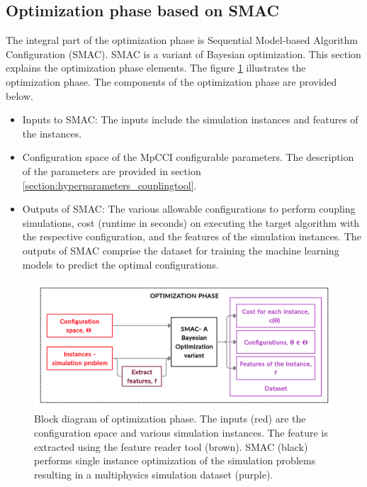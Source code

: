 \subsection{Optimization phase based on SMAC}
\label{section:optimization_phase}

The integral part of the optimization phase is Sequential Model-based Algorithm Configuration (SMAC). SMAC is a variant of Bayesian optimization. This section explains the optimization phase elements. The figure \ref{fig:optimization} illustrates the optimization phase. The components of the optimization phase are provided below.

\begin{itemize}
\item Inputs to SMAC: The inputs include the simulation instances and features of the instances.
\item Configuration space of the MpCCI configurable parameters. The description of the parameters are provided in section \ref{section:hyperparameters_couplingtool}. 
\item Outputs of SMAC: The various allowable configurations to perform coupling simulations, cost (runtime in seconds) on executing the target algorithm with the respective configuration, and the features of the simulation instances. The outputs of SMAC comprise the dataset for training the machine learning models to predict the optimal configurations.
\end{itemize}

\begin{figure}[!ht]
\centering
\includegraphics[width=0.9\linewidth,height=0.4\textheight]{images/Optimizationphase.jpg}
\captionsetup{justification=justified}
\caption[Optimization phase- Block diagram]{Block diagram of optimization phase. The inputs (red) are the configuration space and various simulation instances. The feature is extracted using the feature reader tool (brown). SMAC (black) performs single instance optimization of the simulation problems resulting in a multiphysics simulation dataset (purple).}
\label{fig:optimization}
\end{figure}

